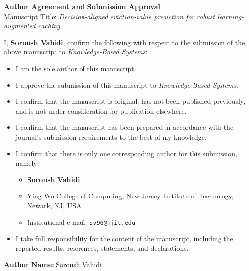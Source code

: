 \documentclass[11pt]{article}
\begin{document}
\begin{center}
{\Large \textbf{Author Agreement and Submission Approval}}\\[1em]
{\large Manuscript Title: \textit{Decision-aligned eviction-value prediction for robust learning-augmented caching}}
\end{center}

\vspace{1em}

I, \textbf{Soroush Vahidi}, confirm the following with respect to the submission of the above manuscript to \textit{Knowledge-Based Systems}:

\begin{itemize}
    \item I am the sole author of this manuscript.
    \item I approve the submission of this manuscript to \textit{Knowledge-Based Systems}.
    \item I confirm that the manuscript is original, has not been published previously, and is not under consideration for publication elsewhere.
    \item I confirm that the manuscript has been prepared in accordance with the journal's submission requirements to the best of my knowledge.
    \item I confirm that there is only one corresponding author for this submission, namely:
    \begin{itemize}
        \item \textbf{Soroush Vahidi}
        \item Ying Wu College of Computing, New Jersey Institute of Technology, Newark, NJ, USA
        \item Institutional e-mail: \texttt{sv96@njit.edu}
    \end{itemize}
    \item I take full responsibility for the content of the manuscript, including the reported results, references, statements, and declarations.
\end{itemize}

\vspace{2em}

\noindent\textbf{Author Name:} Soroush Vahidi

\vspace{1.5em}
\end{document}
